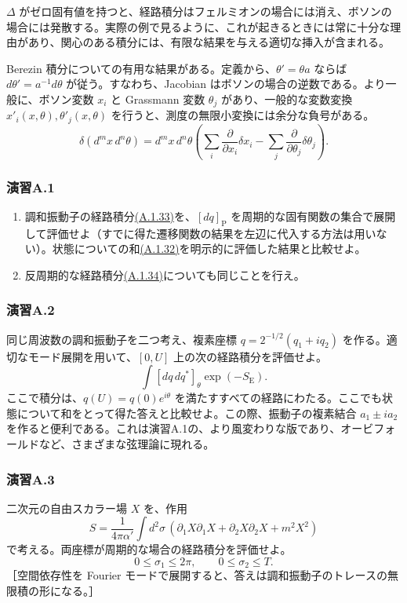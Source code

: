 $\Delta$ がゼロ固有値を持つと、経路積分はフェルミオンの場合には消え、ボソンの場合には発散する。実際の例で見るように、これが起きるときには常に十分な理由があり、関心のある積分には、有限な結果を与える適切な挿入が含まれる。

Berezin 積分についての有用な結果がある。定義から、$\theta'=\theta a$ ならば $d\theta'=a^{-1}d\theta$ が従う。すなわち、Jacobian はボソンの場合の逆数である。より一般に、ボソン変数 $x_i$ と Grassmann 変数 $\theta_j$ があり、一般的な変数変換 $x'_i(x,\theta),\theta'_j(x,\theta)$ を行うと、測度の無限小変換には余分な負号がある。
\begin{equation}
\delta(d^mx\,d^n\theta)
=d^mx\,d^n\theta
\left(\sum_i\frac{\partial}{\partial x_i}\delta x_i
-\sum_j\frac{\partial}{\partial\theta_j}\delta\theta_j\right).
\tag{A.2.29}\label{eq:A.2.29}
\end{equation}


\subsubsection*{演習A.1}\label{ex:A.1}
\begin{enumerate}
\item[(a)] 調和振動子の経路積分\hyperref[eq:A.1.33]{(A.1.33)}を、$[dq]_{\mathrm P}$ を周期的な固有関数の集合で展開して評価せよ（すでに得た遷移関数の結果を左辺に代入する方法は用いない）。状態についての和\hyperref[eq:A.1.32]{(A.1.32)}を明示的に評価した結果と比較せよ。
\item[(b)] 反周期的な経路積分\hyperref[eq:A.1.34]{(A.1.34)}についても同じことを行え。
\end{enumerate}

\subsubsection*{演習A.2}\label{ex:A.2}
同じ周波数の調和振動子を二つ考え、複素座標 $q=2^{-1/2}(q_1+iq_2)$ を作る。適切なモード展開を用いて、$[0,U]$ 上の次の経路積分を評価せよ。
\[
\int[dq\,dq^*]_\theta\exp(-S_{\mathrm E}).
\]
ここで積分は、$q(U)=q(0)e^{i\theta}$ を満たすすべての経路にわたる。ここでも状態について和をとって得た答えと比較せよ。この際、振動子の複素結合 $a_1\pm ia_2$ を作ると便利である。これは演習A.1の、より風変わりな版であり、オービフォールドなど、さまざまな弦理論に現れる。

\subsubsection*{演習A.3}\label{ex:A.3}
二次元の自由スカラー場 $X$ を、作用
\[
S=\frac1{4\pi\alpha'}\int d^2\sigma\,
\left(\partial_1X\partial_1X+\partial_2X\partial_2X+m^2X^2\right)
\]
で考える。両座標が周期的な場合の経路積分を評価せよ。
\[
0\leq\sigma_1\leq2\pi,\qquad0\leq\sigma_2\leq T.
\]
［空間依存性を Fourier モードで展開すると、答えは調和振動子のトレースの無限積の形になる。］


